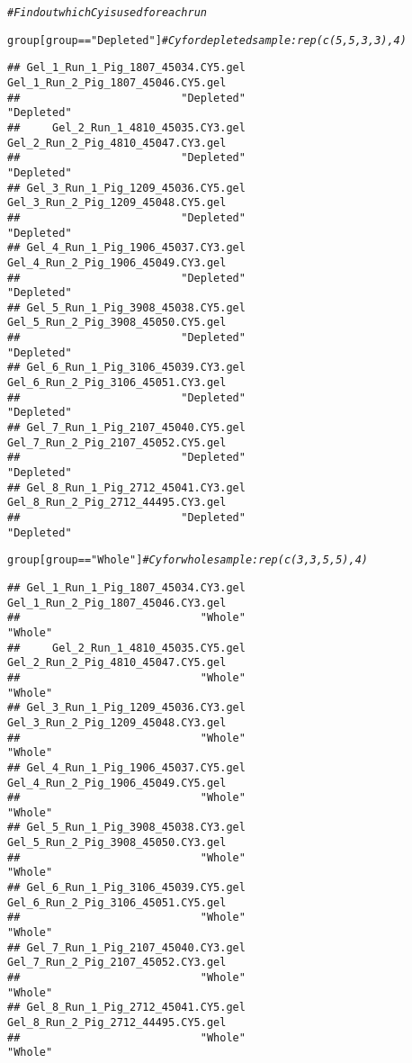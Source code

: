 \documentclass{article}\usepackage[]{graphicx}\usepackage[]{color}
\makeatletter
\newcommand{\hlstr}[1]{\textcolor[rgb]{0.192,0.494,0.8}{#1}}%
\newcommand{\hlcom}[1]{\textcolor[rgb]{0.678,0.584,0.686}{\textit{#1}}}%
\newcommand{\hlopt}[1]{\textcolor[rgb]{0,0,0}{#1}}%
\newcommand{\hlstd}[1]{\textcolor[rgb]{0.345,0.345,0.345}{#1}}%
\newenvironment{kframe}{%
 \def\at@end@of@kframe{}%
 \ifinner\ifhmode%
  \def\at@end@of@kframe{\end{minipage}}%
  \begin{minipage}{\columnwidth}%
 \fi\fi%
 \def\FrameCommand##1{\hskip\@totalleftmargin \hskip-\fboxsep
 \colorbox{shadecolor}{##1}\hskip-\fboxsep
     \hskip-\linewidth \hskip-\@totalleftmargin \hskip\columnwidth}%
 \MakeFramed {\advance\hsize-\width
   \@totalleftmargin\z@ \linewidth\hsize
   \@setminipage}}%
 {\par\unskip\endMakeFramed%
 \at@end@of@kframe}
\newenvironment{knitrout}{}{} %
\makeatother
\begin{document}
\begin{knitrout}
\color{fgcolor}\begin{kframe}
\begin{alltt}
\hlcom{# Find out which Cy is used for each run}

\hlstd{group[group}\hlopt{==}\hlstr{"Depleted"}\hlstd{]} \hlcom{# Cy for depleted sample : rep(c(5,5,3,3),4)}
\end{alltt}
\begin{verbatim}
## Gel_1_Run_1_Pig_1807_45034.CY5.gel Gel_1_Run_2_Pig_1807_45046.CY5.gel 
##                         "Depleted"                         "Depleted" 
##     Gel_2_Run_1_4810_45035.CY3.gel Gel_2_Run_2_Pig_4810_45047.CY3.gel 
##                         "Depleted"                         "Depleted" 
## Gel_3_Run_1_Pig_1209_45036.CY5.gel Gel_3_Run_2_Pig_1209_45048.CY5.gel 
##                         "Depleted"                         "Depleted" 
## Gel_4_Run_1_Pig_1906_45037.CY3.gel Gel_4_Run_2_Pig_1906_45049.CY3.gel 
##                         "Depleted"                         "Depleted" 
## Gel_5_Run_1_Pig_3908_45038.CY5.gel Gel_5_Run_2_Pig_3908_45050.CY5.gel 
##                         "Depleted"                         "Depleted" 
## Gel_6_Run_1_Pig_3106_45039.CY3.gel Gel_6_Run_2_Pig_3106_45051.CY3.gel 
##                         "Depleted"                         "Depleted" 
## Gel_7_Run_1_Pig_2107_45040.CY5.gel Gel_7_Run_2_Pig_2107_45052.CY5.gel 
##                         "Depleted"                         "Depleted" 
## Gel_8_Run_1_Pig_2712_45041.CY3.gel Gel_8_Run_2_Pig_2712_44495.CY3.gel 
##                         "Depleted"                         "Depleted"
\end{verbatim}
\begin{alltt}
\hlstd{group[group}\hlopt{==}\hlstr{"Whole"}\hlstd{]} \hlcom{# Cy for whole sample : rep(c(3,3,5,5),4)}
\end{alltt}
\begin{verbatim}
## Gel_1_Run_1_Pig_1807_45034.CY3.gel Gel_1_Run_2_Pig_1807_45046.CY3.gel 
##                            "Whole"                            "Whole" 
##     Gel_2_Run_1_4810_45035.CY5.gel Gel_2_Run_2_Pig_4810_45047.CY5.gel 
##                            "Whole"                            "Whole" 
## Gel_3_Run_1_Pig_1209_45036.CY3.gel Gel_3_Run_2_Pig_1209_45048.CY3.gel 
##                            "Whole"                            "Whole" 
## Gel_4_Run_1_Pig_1906_45037.CY5.gel Gel_4_Run_2_Pig_1906_45049.CY5.gel 
##                            "Whole"                            "Whole" 
## Gel_5_Run_1_Pig_3908_45038.CY3.gel Gel_5_Run_2_Pig_3908_45050.CY3.gel 
##                            "Whole"                            "Whole" 
## Gel_6_Run_1_Pig_3106_45039.CY5.gel Gel_6_Run_2_Pig_3106_45051.CY5.gel 
##                            "Whole"                            "Whole" 
## Gel_7_Run_1_Pig_2107_45040.CY3.gel Gel_7_Run_2_Pig_2107_45052.CY3.gel 
##                            "Whole"                            "Whole" 
## Gel_8_Run_1_Pig_2712_45041.CY5.gel Gel_8_Run_2_Pig_2712_44495.CY5.gel 
##                            "Whole"                            "Whole"
\end{verbatim}
\end{kframe}
\end{knitrout}
\end{document}
